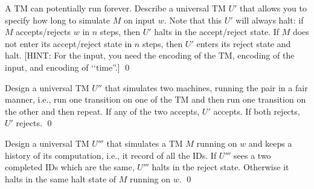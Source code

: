 \newpage
\begin{ex}
  A TM can potentially run forever.
  Describe a universal TM $U'$
  that allows you to specify how long to
  simulate $M$ on input $w$.
  Note that this $U'$ will always halt:
  if $M$ accepts/rejects $w$ in $n$ steps, then $U'$ halts in the
  accept/reject state.
  If $M$ does not enter its accept/reject state in $n$ steps,
  then $U'$ enters its reject state and halt.
  [HINT: For the input, you need the encoding of the
  TM, encoding of the input, and encoding of \lq\lq time''.]
  \qed
\end{ex}

\newpage
\begin{ex}
  Design a universal TM $U''$ that simulates two machines,
  running the pair in a fair manner, i.e., run one transition
  on one of the TM and then run one transition on the other
  and then repeat.
  If any of the two accepts, $U'$ accepts.
  If both rejects, $U'$ rejects.  
  \qed
\end{ex}

\newpage
\begin{ex}
  Design a universal TM $U'''$ that simulates a TM $M$ running on $w$
  and keeps a history of its computation, i.e., it record of all the IDs.
  If $U'''$ sees a two completed IDs which are the same,
  $U'''$ halts in the reject state.
  Otherwise it halts in the same halt state of $M$ running on $w$.
  \qed
\end{ex}
